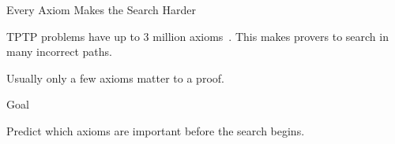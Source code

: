 \begin{minipage}[t][1266pt][t]{\textwidth}
	\begin{block}{Every Axiom Makes the Search Harder}
		\Large
		\vspace{14pt}

		TPTP problems have up to 3 million axioms~\cite{sutcliffe2017tptp}.
		This makes provers to search in many incorrect paths.

		\vspace{53pt}

		Usually only a few axioms matter to a proof.

		\vspace{48pt}

		\Large
		{\par}

		\vspace{16pt}

	\end{block}

	\vfill

	\begin{exampleblock}{Goal}
		\Large
		\vspace{14pt}

		Predict which axioms are important before the search begins.
	\end{exampleblock}
\end{minipage}
